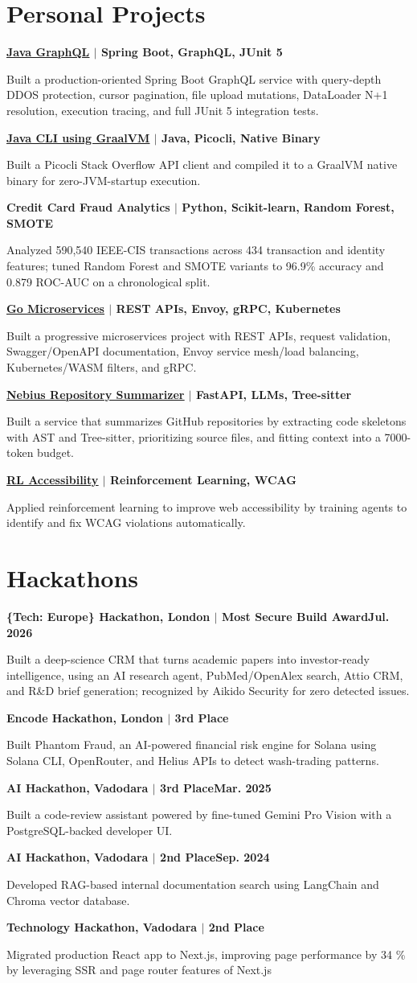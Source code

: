 \documentclass[a4paper,10pt]{article}
\newcommand{\projectLink}[2]{\href{#1}{\underline{#2}}}
\newcommand{\compactEntry}[3]{%
  \textbf{#1}\hfill{\small\textbf{#2}}\\[-1pt]
  {\small #3\par}\vspace{2pt}
}
\begin{document}
\section{Personal Projects}
\compactEntry{\projectLink{https://github.com/aymanapatel/java-graphql}{Java GraphQL} $|$ Spring Boot, GraphQL, JUnit 5}{}{Built a production-oriented Spring Boot GraphQL service with query-depth DDOS protection, cursor pagination, file upload mutations, DataLoader N+1 resolution, execution tracing, and full JUnit 5 integration tests.}
\compactEntry{\projectLink{https://github.com/aymanapatel/java-cli}{Java CLI using GraalVM} $|$ Java, Picocli, Native Binary}{}{Built a Picocli Stack Overflow API client and compiled it to a GraalVM native binary for zero-JVM-startup execution.}
\compactEntry{Credit Card Fraud Analytics $|$ Python, Scikit-learn, Random Forest, SMOTE}{}{Analyzed 590,540 IEEE-CIS transactions across 434 transaction and identity features; tuned Random Forest and SMOTE variants to 96.9\% accuracy and 0.879 ROC-AUC on a chronological split.}
\compactEntry{\projectLink{https://github.com/aymanapatel/golang-microservices}{Go Microservices} $|$ REST APIs, Envoy, gRPC, Kubernetes}{}{Built a progressive microservices project with REST APIs, request validation, Swagger/OpenAPI documentation, Envoy service mesh/load balancing, Kubernetes/WASM filters, and gRPC.}
\compactEntry{\projectLink{https://github.com/aymanapatel/nebius-project}{Nebius Repository Summarizer} $|$ FastAPI, LLMs, Tree-sitter}{}{Built a service that summarizes GitHub repositories by extracting code skeletons with AST and Tree-sitter, prioritizing source files, and fitting context into a 7000-token budget.}
\compactEntry{\projectLink{https://github.com/aymanapatel/rl-a11y}{RL Accessibility} $|$ Reinforcement Learning, WCAG}{}{Applied reinforcement learning to improve web accessibility by training agents to identify and fix WCAG violations automatically.}

\section{Hackathons}
\compactEntry{\{Tech: Europe\} Hackathon, London $|$ Most Secure Build Award}{Jul. 2026}{Built a deep-science CRM that turns academic papers into investor-ready intelligence, using an AI research agent, PubMed/OpenAlex search, Attio CRM, and R\&D brief generation; recognized by Aikido Security for zero detected issues.}
\compactEntry{Encode Hackathon, London $|$ 3rd Place}{}{Built Phantom Fraud, an AI-powered financial risk engine for Solana using Solana CLI, OpenRouter, and Helius APIs to detect wash-trading patterns.}
\compactEntry{AI Hackathon, Vadodara $|$ 3rd Place}{Mar. 2025}{Built a code-review assistant powered by fine-tuned Gemini Pro Vision with a PostgreSQL-backed developer UI.}
\compactEntry{AI Hackathon, Vadodara $|$ 2nd Place}{Sep. 2024}{Developed RAG-based internal documentation search using LangChain and Chroma vector database.}
\compactEntry{Technology Hackathon, Vadodara $|$ 2nd Place}{}{Migrated production React app to Next.js, improving page performance by 34 \% by leveraging SSR and page router features of Next.js}
\end{document}
